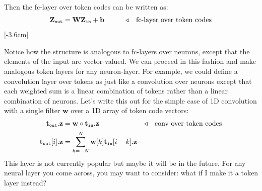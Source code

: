 Then the fc-layer over token codes can be written as:
\begin{align}
    \mathbf{Z}_{\texttt{out}} &= \mathbf{W}\mathbf{Z}_{\texttt{in}} + \mathbf{b} \quad\quad &\triangleleft \quad \text{fc-layer over token codes}
\end{align}
[-3.6cm]

Notice how the structure is analogous to fc-layers over neurons, except that the elements of the input are vector-valued. We can proceed in this fashion and make analogous token layers for any neuron-layer. For example, we could define a convolution layer over tokens as just like a convolution over neurons except that each weighted sum is a linear combination of tokens rather than a linear combination of neurons. Let's write this out for the simple case of 1D convolution with a single filter $\mathbf{w}$ over a 1D array of token code vectors:
\begin{align}
    \mathbf{t}_{\texttt{out}}.\mathbf{z} &= \mathbf{w} \circ \mathbf{t}_{\texttt{in}}.\mathbf{z} \quad\quad &\triangleleft \quad \text{conv over token codes}\\
    \mathbf{t}_{\texttt{out}}[i].\mathbf{z} &= \sum_{k=-N}^N \mathbf{w}[k] \mathbf{t}_{\texttt{in}}[i-k].\mathbf{z}
\end{align}
This layer is not currently popular but maybe it will be in the future. For any neural layer you come across, you may want to consider: what if I make it a token layer instead?

